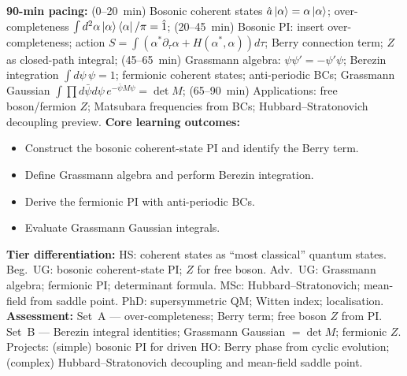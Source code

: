 \documentclass[11pt,a4paper]{article}
\begin{document}
\begin{tcolorbox}[modulebox, title={Module~II.2 --- Lecture L07: Coherent-State Path Integrals}]
\textbf{90-min pacing:} (0--20~min) Bosonic coherent states $\hat{a}\ket{\alpha}=\alpha\ket{\alpha}$; over-completeness $\int d^2\alpha\ket{\alpha}\bra{\alpha}/\pi=\hat{1}$; (20--45~min) Bosonic PI: insert over-completeness; action $S=\int(\alpha^*\partial_\tau\alpha+H(\alpha^*,\alpha))d\tau$; Berry connection term; $Z$ as closed-path integral; (45--65~min) Grassmann algebra: $\psi\psi'=-\psi'\psi$; Berezin integration $\int d\psi\,\psi=1$; fermionic coherent states; anti-periodic BCs; Grassmann Gaussian $\int\prod d\bar\psi d\psi\,e^{-\bar\psi M\psi}=\det M$; (65--90~min) Applications: free boson/fermion $Z$; Matsubara frequencies from BCs; Hubbard--Stratonovich decoupling preview.
\medskip\textbf{Core learning outcomes:}
\begin{itemize}[leftmargin=1.4em,topsep=2pt,itemsep=1pt]
  \item Construct the bosonic coherent-state PI and identify the Berry term.
  \item Define Grassmann algebra and perform Berezin integration.
  \item Derive the fermionic PI with anti-periodic BCs.
  \item Evaluate Grassmann Gaussian integrals.
\end{itemize}
\medskip\textbf{Tier differentiation:}
HS: coherent states as ``most classical'' quantum states.
Beg.\ UG: bosonic coherent-state PI; $Z$ for free boson.
Adv.\ UG: Grassmann algebra; fermionic PI; determinant formula.
MSc: Hubbard--Stratonovich; mean-field from saddle point.
PhD: supersymmetric QM; Witten index; localisation.
\medskip\textbf{Assessment:}
Set~A --- over-completeness; Berry term; free boson $Z$ from PI.
Set~B --- Berezin integral identities; Grassmann Gaussian $=\det M$; fermionic $Z$.
Projects: (simple) bosonic PI for driven HO: Berry phase from cyclic evolution; (complex) Hubbard--Stratonovich decoupling and mean-field saddle point.
\end{tcolorbox}

\medskip
\end{document}
